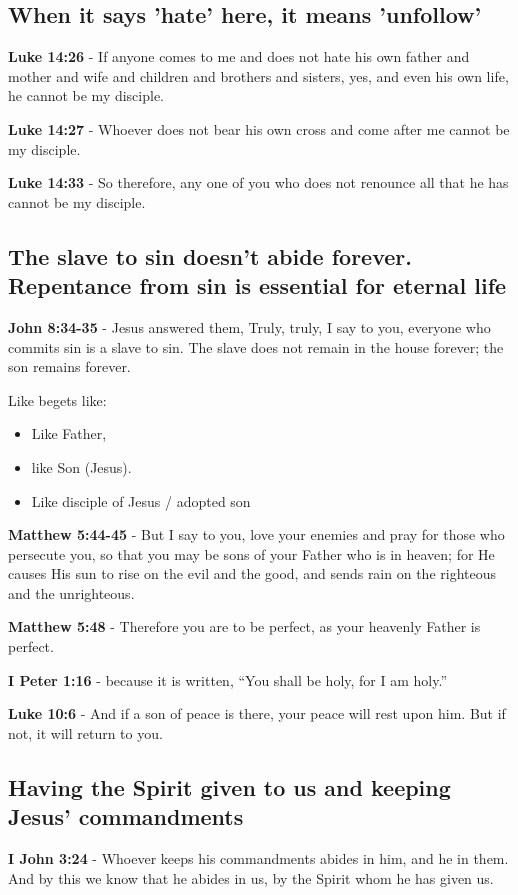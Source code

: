 \documentclass[11pt]{article}
\begin{document}
\subsection{When it says 'hate' here, it means 'unfollow'}
\label{sec:orgc189651}
\textbf{Luke 14:26} - If anyone comes to me and does not hate his own father and mother and wife and children and brothers and sisters, yes, and even his own life, he cannot be my disciple.

\textbf{Luke 14:27} - Whoever does not bear his own cross and come after me cannot be my disciple.

\textbf{Luke 14:33} - So therefore, any one of you who does not renounce all that he has cannot be my disciple.

\subsection{The slave to sin doesn't abide forever. Repentance from sin is essential for eternal life}
\label{sec:org94e9746}
\textbf{John 8:34-35} - Jesus answered them, Truly, truly, I say to you, everyone who commits sin is a slave to sin. The slave does not remain in the house forever; the son remains forever.

Like begets like:
\begin{itemize}
\item Like Father,
\item like Son (Jesus).
\item Like disciple of Jesus / adopted son
\end{itemize}

\textbf{Matthew 5:44-45} - But I say to you, love your enemies and pray for those who persecute you, so that you may be sons of your Father who is in heaven; for He causes His sun to rise on the evil and the good, and sends rain on the righteous and the unrighteous.

\textbf{Matthew 5:48} - Therefore you are to be perfect, as your heavenly Father is perfect.

\textbf{I Peter 1:16} - because it is written, “You shall be holy, for I am holy.”

\textbf{Luke 10:6} - And if a son of peace is there, your peace will rest upon him. But if not, it will return to you.

\subsection{Having the Spirit given to us and keeping Jesus' commandments}
\label{sec:org23dca3d}
\textbf{I John 3:24} - Whoever keeps his commandments abides in him, and he in them. And by this we know that he abides in us, by the Spirit whom he has given us.
\end{document}
